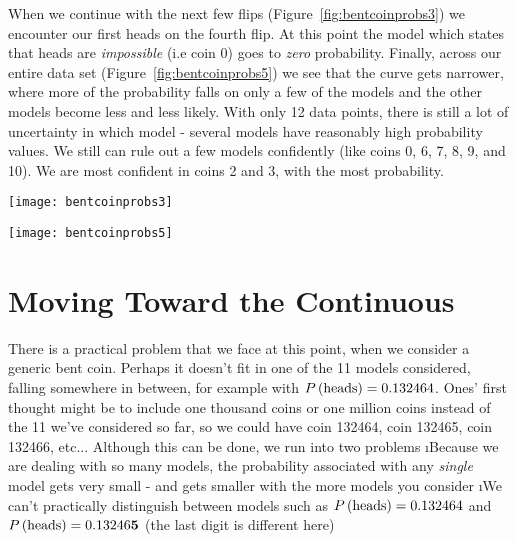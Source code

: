 When we continue with the next few flips (Figure~\ref{fig:bentcoinprobs3}) we encounter our first heads on the fourth flip.  At this point the model which states that heads are {\em impossible} (i.e coin 0) goes to \emph{zero} probability.  Finally, across our entire data set (Figure~\ref{fig:bentcoinprobs5}) we see that the curve gets narrower, where more of the probability falls on only a few of the models and the other models become less and less likely.  With only 12 data points, there is still a lot of uncertainty in which model - several models have reasonably high probability values.  We still can rule out a few models confidently (like coins 0, 6, 7, 8, 9, and 10).  We are most confident in coins 2 and 3, with the most probability. 

\vspace{1in}
\begin{figure*}
\texttt{[image: bentcoinprobs3]}
\label{fig:bentcoinprobs3}
\caption{Probability for different bent-coin models, given three tails (left), the first heads (middle), and another tails (right).  When the first heads is observed, the model which states that heads are {\em impossible} (coin 0) goes to zero probability.}
\end{figure*}





\begin{figure*}
\texttt{[image: bentcoinprobs5]}
\label{fig:bentcoinprobs5}
\caption{Probability for different bent-coin models, given no data (left), the first half of the data set (middle), and the entire data set of 9 tails and 3 heads (right).}
\end{figure*}



\section{Moving Toward the Continuous}\label{sec:continuous}

There is a practical problem that we face at this point, when we consider a generic bent coin.  Perhaps it doesn't fit in one of the 11 models considered, falling somewhere in between, for example with $\P{heads}=0.132464$. Ones' first thought might be to include one thousand coins or one million coins instead of the 11 we've considered so far, so we could have coin 132464, coin 132465, coin 132466, etc...  Although this can be done, we run into two problems
\be
\i Because we are dealing with so many models, the probability associated with any \emph{single} model gets very small - and gets smaller with the more models you consider
\i We can't practically distinguish between models such as $\P{heads}=0.132464$ and $\P{heads}=0.13246{\bf 5}$ (the last digit is different here)
\ee

